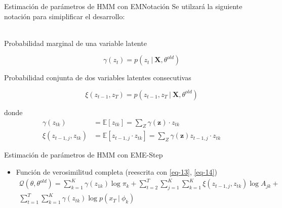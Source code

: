 \begin{frame}{Estimación de parámetros de HMM con EM}{Notación}  
  Se utilzará la siguiente notación para simiplificar el desarrollo: \\~\\
  \begin{description}
        \item[Probabilidad marginal de una variable latente]
          \begin{equation}
            \gamma(z_t) = p(z_t ~|~ \mathbf{X}, \theta^{old})
            \label{eqn:3-3}
          \end{equation}

        \item[Probabilidad conjunta de dos variables latentes consecutivas]
          \begin{equation}
            \xi(z_{t-1}, z_T) = p(z_{t-1}, z_T ~|~ \mathbf{X}, \theta^{old})
            \label{eqn:3-4}
          \end{equation}
      \end{description}
      donde
      \begin{align}
        \gamma(z_{tk}) &= \mathbb{E} \left[ z_{tk} \right] = 
                \sum_Z  \gamma(\mathbf{z}) \cdot z_{tk} \label{eq-13} \\
        \xi(z_{t-1,j}, z_{tk}) &= \mathbb{E} \left[z_{t-1, j} \cdot z_{tk} \right] = 
          \sum_Z  \gamma(\mathbf{z}) z_{t-1, j} \cdot z_{tk} \label{eq-14}
      \end{align}  
      
\end{frame}

\begin{frame}{Estimación de parámetros de HMM con EM}{E-Step}
  \begin{itemize}
    \item Función de verosimilitud completa (reescrita con \eqref{eq-13}, \eqref{eq-14})
      \begin{equation}
        \begin{split}
          \mathcal{Q}(\theta, \theta^{old}) = 
          \sum_{k=1}^K \gamma(z_{1k}) \log \pi_k + 
          \sum_{t=2}^T \sum_{j=1}^K \sum_{k=1}^K \xi(z_{t-1,j}, z_{tk}) \log A_{jk} + \\
          \sum_{t=1}^T \sum_{k=1}^K \gamma(z_{tk}) \log p(x_T ~|~ \phi_k)
        \end{split}
      \end{equation}
  \end{itemize}
\end{frame}          

